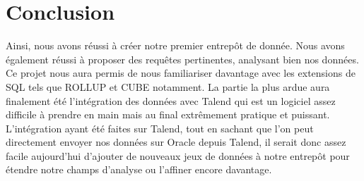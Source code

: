 \documentclass[a4paper,sffamily,12pt]{article}
\begin{document}
		\vspace{0.5cm}
																
	\section{Conclusion}

		\vspace{0.5cm}
		
		Ainsi, nous avons réussi à créer notre premier entrepôt de donnée. Nous avons également réussi à proposer des requêtes pertinentes, analysant bien nos données. Ce projet nous aura permis de nous familiariser davantage avec les extensions de SQL tels que ROLLUP et CUBE notamment. La partie la plus ardue aura finalement été l'intégration des données avec Talend qui est un logiciel assez difficile à prendre en main mais au final extrêmement pratique et puissant. L'intégration ayant été faites sur Talend, tout en sachant que l'on peut directement envoyer nos données sur Oracle depuis Talend, il serait donc assez facile aujourd'hui d'ajouter de nouveaux jeux de données à notre entrepôt pour étendre notre champs d'analyse ou l'affiner encore davantage. \\
						
\end{document}
